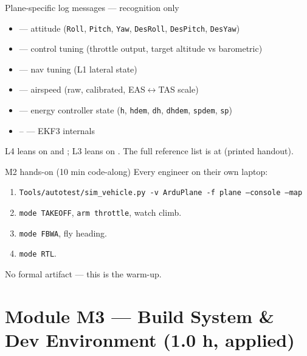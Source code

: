 \documentclass[aspectratio=169,11pt]{beamer}
\begin{document}
\begin{frame}[allowframebreaks]{Plane-specific log messages --- recognition only}
  \begin{itemize}
    \item {} --- attitude (\texttt{Roll}, \texttt{Pitch}, \texttt{Yaw}, \texttt{DesRoll}, \texttt{DesPitch}, \texttt{DesYaw})
    \item {} --- control tuning (throttle output, target altitude vs barometric)
    \item {} --- nav tuning (L1 lateral state)
    \item {} --- airspeed (raw, calibrated, EAS$\leftrightarrow$TAS scale)
    \item {} --- energy controller state (\texttt{h}, \texttt{hdem}, \texttt{dh}, \texttt{dhdem}, \texttt{spdem}, \texttt{sp})
    \item {}-- --- EKF3 internals
  \end{itemize}
  \vfill
  L4 leans on  and ; L3 leans on . The full reference list is at  (printed handout).
\end{frame}

\begin{frame}[allowframebreaks]{M2 hands-on (10 min code-along)}
  Every engineer on their own laptop:
  \begin{enumerate}
    \item \texttt{Tools/autotest/sim\_vehicle.py -v ArduPlane -f plane --console --map}
    \item \texttt{mode TAKEOFF}, \texttt{arm throttle}, watch climb.
    \item \texttt{mode FBWA}, fly heading.
    \item \texttt{mode RTL}.
  \end{enumerate}
  \vfill
  No formal artifact --- this is the warm-up.
\end{frame}

\section{Module M3 --- Build System \& Dev Environment (1.0 h, applied)}
\end{document}
